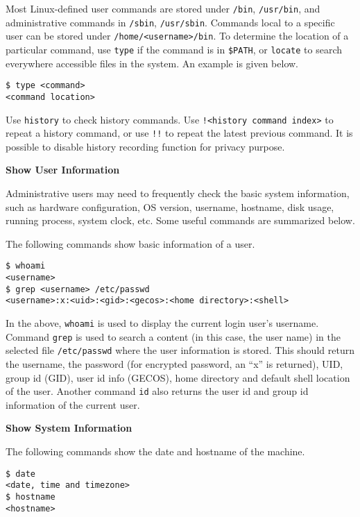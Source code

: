 Most Linux-defined user commands are stored under \verb|/bin|, \verb|/usr/bin|, and administrative commands in \verb|/sbin|, \verb|/usr/sbin|. Commands local to a specific user can be stored under \verb|/home/<username>/bin|. To determine the location of a particular command, use \verb|type| if the command is in \verb|$PATH|, or \verb|locate| to search everywhere accessible files in the system. An example is given below.
\begin{verbatim}
$ type <command>
<command location>
\end{verbatim}

Use \verb|history| to check history commands. Use \verb|!<history command index>| to repeat a history command, or use \verb|!!| to repeat the latest previous command. It is possible to disable history recording function for privacy purpose.

\vspace{0.1in}
\noindent \textbf{Show User Information}
\vspace{0.1in}

Administrative users may need to frequently check the basic system information, such as hardware configuration, OS version, username, hostname, disk usage, running process, system clock, etc. Some useful commands are summarized below.

The following commands show basic information of a user.
\begin{verbatim}
$ whoami
<username>
$ grep <username> /etc/passwd
<username>:x:<uid>:<gid>:<gecos>:<home directory>:<shell>
\end{verbatim}
In the above, \verb|whoami| is used to display the current login user's username. Command \verb|grep| is used to search a content (in this case, the user name) in the selected file \verb|/etc/passwd| where the user information is stored. This should return the username, the password (for encrypted password, an ``x'' is returned), UID, group id (GID), user id info (GECOS), home directory and default shell location of the user.
Another command \verb|id| also returns the user id and group id information of the current user.


\vspace{0.1in}
\noindent \textbf{Show System Information}
\vspace{0.1in}

The following commands show the date and hostname of the machine.
\begin{verbatim}
$ date
<date, time and timezone>
$ hostname
<hostname>
\end{verbatim}

